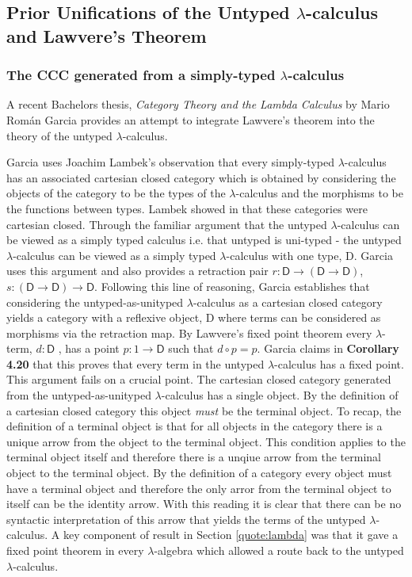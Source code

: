 \subsection{Prior Unifications of the Untyped $\lambda$-calculus and
Lawvere's Theorem}
\label{quote:prior}
\subsubsection{The CCC generated from a simply-typed $\lambda$-calculus}


A recent Bachelors thesis, \textit{Category Theory and the Lambda Calculus} by Mario
Rom\'an Garcia provides an attempt to integrate Lawvere's theorem into the
theory of the untyped $\lambda$-calculus.

Garcia uses Joachim Lambek's observation that every simply-typed
$\lambda$-calculus has an associated cartesian closed category which is obtained
by considering the objects of the category to be the types of the
$\lambda$-calculus and the morphisms to be the functions between types. Lambek
showed in \cite{lambek1985cartesian} that these categories were cartesian closed. Through the
familiar argument that the untyped $\lambda$-calculus can
be viewed as a simply typed calculus i.e.  that untyped is uni-typed - the
untyped $\lambda$-calculus can be viewed as a simply typed $\lambda$-calculus
with one type, \textsf{D}. Garcia uses this argument and also provides a
retraction pair $r : \textsf{D} \rightarrow (\textsf{D} \rightarrow
\textsf{D})$, $s : (\textsf{D} \rightarrow \textsf{D}) \rightarrow \textsf{D}$.
Following this line of reasoning, Garcia establishes that considering the
untyped-as-unityped $\lambda$-calculus as a cartesian closed category yields a
category with a reflexive object, \textsf{D} where terms can be considered as
morphisms via the retraction map. By Lawvere's fixed point theorem every
$\lambda$-term, $d : \textsf{D}$ , has a point $p: 1 \rightarrow \textsf{D}$
such that $d \circ p = p$. Garcia claims in \textbf{Corollary 4.20} that this
proves that every term in the untyped $\lambda$-calculus has a fixed point. This
argument fails on a crucial point. The cartesian closed category generated from
the untyped-as-unityped $\lambda$-calculus has a single object. By the
definition of a cartesian closed category this object \textit{must} be the
terminal object. To recap, the definition of a terminal object is that for all
objects in the category there is a unique arrow from the object to the terminal
object. This condition applies to the terminal object itself and therefore there
is a unqiue arrow from the terminal object to the terminal object. By the
definition of a category every object must have a terminal object and therefore
the only arror from the terminal object to itself can be the identity arrow.
With this reading it is clear that there can be no syntactic interpretation of
this arrow that yields the terms of the untyped $\lambda$-calculus. A key
component of result in Section \ref{quote:lambda}  was that it gave a fixed point
theorem in every $\lambda$-algebra which allowed a route back to the untyped
$\lambda$-calculus.

